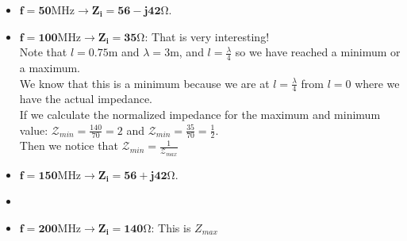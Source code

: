 \begin{itemize}
    \item $\bm{f=50}\si{\mega\hertz}\bm{\rightarrow Z_i=56-j42}\si{\ohm}$.
    \item $\bm{f=100}\si{\mega\hertz}\bm{\rightarrow Z_i=35}\si{\ohm}$: That is very interesting!\\
    Note that $l=0.75\si{\metre}$ and $\lambda=3\si{\metre}$, and $l=\frac{\lambda}{4}$ so we have reached a minimum or a maximum.\\
    We know that this is a minimum because we are at $l=\frac{\lambda}{4}$ from $l=0$ where we have the actual impedance.\\
    If we calculate the normalized impedance for the maximum and minimum value: $\mathcal{Z}_{min}=\frac{140}{70}=2$ and $\mathcal{Z}_{min}=\frac{35}{70}=\frac{1}{2}$.\\
    Then we notice that $\mathcal{Z}_{min}=\frac{1}{\mathcal{Z}_{max}}$
    \item $\bm{f=150}\si{\mega\hertz}\bm{\rightarrow Z_i=56+j42}\si{\ohm}$.
    \item \item $\bm{f=200}\si{\mega\hertz}\bm{\rightarrow Z_i=140}\si{\ohm}$: This is $Z_{max}$
\end{itemize}
